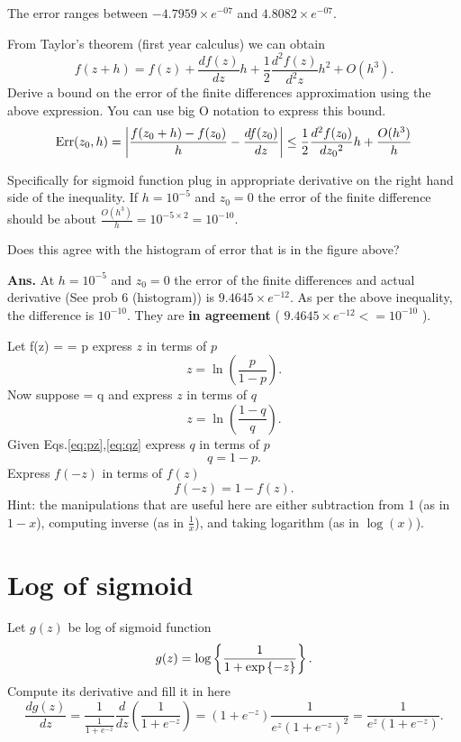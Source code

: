 \documentclass{article}
\begin{document}
\begin{remark} The error ranges between $-4.7959 \times e^{-07}$ and $4.8082 \times e^{-07}$.
\end{remark}

\newproblem{1pt}
From Taylor's theorem (first year calculus) we can obtain
\[
f(z+h) = f(z) + \frac{df(z)}{dz}h + \frac{1}{2}\frac{d^2f(z)}{d^2z}h^2 + O(h^3).
\]
Derive a bound on the error of the finite differences approximation using the above expression. You can use big O notation to express this bound.
\[
\textrm{Err}(z_0,h) = \left| \frac{f(z_0+h) - f(z_0)}{h} - \frac{df(z_0)}{dz} \right| \leq \frac{1}{2} \frac{d^{2}f(z_{0})}{d{z_{0}}^{2}} h + \frac{O(h^{3})}{h}
\]

Specifically for sigmoid function plug in appropriate derivative on the right hand side of the inequality. If $h=10^{-5}$ and $z_0 = 0$ the error of the finite difference should be about $\frac{O(h^{3})}{h} = 10^{-5 \times 2} = 10^{-10}$.

Does this agree with the histogram of error that is in the figure above?

\textbf{Ans.} At $h=10^{-5}$ and $z_0 = 0$ the error of the finite differences and actual derivative (See prob 6 (histogram)) is $9.4645 \times e^{-12}$. As per the above inequality, the difference is $10^{-10}$. They are \textbf{in agreement} ( $9.4645 \times e^{-12} <= 10^{-10}$ ).

\newproblem{1pt}
Let
\BEQ\label{eq:pz}
f(z) =  = p
\EEQ
express $z$ in terms of $p$
\[
z = \ln{(\frac{p}{1-p})}.
\]
Now suppose
\BEQ\label{eq:qz}
 = q
\EEQ
and express $z$ in terms of $q$
\[
z = \ln{(\frac{1-q}{q})}.
\]
Given Eqs.\eqref{eq:pz},\eqref{eq:qz} express $q$ in terms of $p$
\[
q = 1-p. 
\]
Express $f(-z)$ in terms of $f(z)$
\[
f(-z) = 1 - f(z).
\]
Hint: the manipulations that are useful here are either subtraction from 1 (as in $1-x$), computing inverse (as in $\frac{1}{x}$), and taking logarithm (as in $\log(x)$).

\section*{Log of sigmoid}
\newproblem{1pt}

Let $g(z)$ be log of sigmoid function
\[
g(z) = \mathop{\rm log}\left\{ \frac{1}{1+ \mathop{\rm exp}\left\{-z\right\}} \right\}.
\]
Compute its derivative and fill it in here
\[
\frac{dg(z)}{dz} = \frac{1}{\frac{1}{1+e^{-z}}} \frac{d}{dz}(\frac{1}{1+e^{-z}}) = (1+e^{-z}) \frac{1}{e^{z}(1+e^{-z})^{2}} = \frac{1}{e^{z}(1+e^{-z})}.
\]
\end{document}
